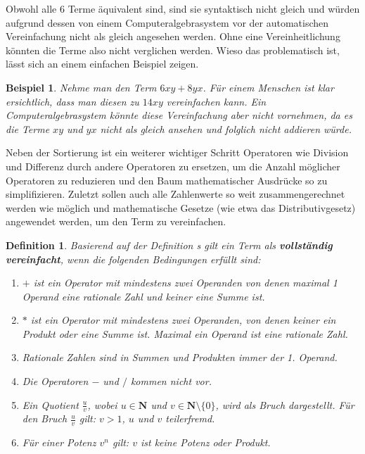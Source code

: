 \documentclass[11pt]{article}
\newtheorem{defin}{Definition}
\newtheorem{example}{Beispiel}
\begin{document}
Obwohl alle 6 Terme äquivalent sind, sind sie syntaktisch nicht gleich und würden aufgrund dessen von einem Computeralgebrasystem
vor der automatischen Vereinfachung nicht als gleich angesehen werden. Ohne eine Vereinheitlichung könnten die Terme also nicht 
verglichen werden.
Wieso das problematisch ist, lässt sich an einem einfachen Beispiel zeigen.

\begin{example} \normalfont
  Nehme man den Term $6xy+8yx$. Für einem Menschen ist klar ersichtlich, dass man diesen zu $14xy$ vereinfachen kann.
  Ein Computeralgebrasystem könnte diese Vereinfachung aber nicht vornehmen, da es die Terme $xy$ und $yx$ nicht als gleich
  ansehen und folglich nicht addieren würde. 
\end{example}

Neben der Sortierung ist ein weiterer wichtiger Schritt Operatoren wie Division und Differenz durch andere Operatoren
zu ersetzen, um die Anzahl möglicher Operatoren zu reduzieren und den Baum mathematischer Ausdrücke so zu simplifizieren. \newline
Zuletzt sollen auch alle Zahlenwerte so weit zusammengerechnet werden wie möglich und mathematische Gesetze 
(wie etwa das Distributivgesetz) angewendet werden, um den Term zu vereinfachen.

\begin{defin}
  Basierend auf der Definition \citeauthor{CAS_EA}s \cite[90 - 92]{CAS_EA} gilt ein Term als
  \textbf{vollständig vereinfacht}, wenn die folgenden Bedingungen erfüllt sind:
  \begin{enumerate}
    \item $+$ ist ein Operator mit mindestens zwei Operanden von denen maximal 1 Operand eine rationale Zahl und keiner eine Summe ist. 
    \item $*$ ist ein Operator mit mindestens zwei Operanden, von denen keiner ein Produkt oder eine Summe ist. 
          Maximal ein Operand ist eine rationale Zahl. 
    \item Rationale Zahlen sind in Summen und Produkten immer der 1. Operand.
    \item Die Operatoren $-$ und $/$ kommen nicht vor.
    \item Ein Quotient $\frac{u}{v}$, wobei $u \in \mathbf{N}$ und $v \in \mathbf{N}\setminus{\{0\}}$, 
          wird als Bruch dargestellt. Für den Bruch $\frac{u}{v}$ gilt: $v > 1$, $u$ und $v$ teilerfremd. 
    \item Für einer Potenz $v^n$ gilt: $v$ ist keine Potenz oder Produkt.
  \end{enumerate}
\end{defin}
\end{document}
